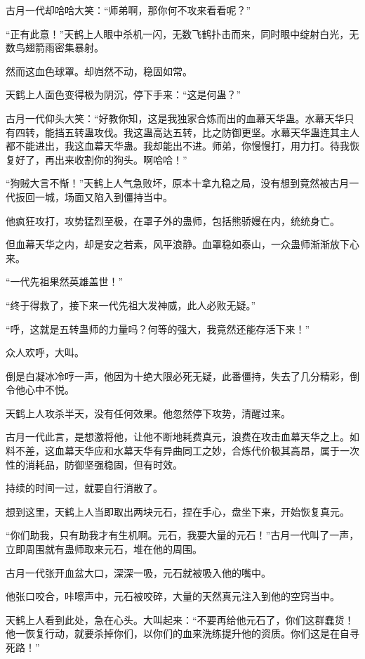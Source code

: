 \begin{this_body}
古月一代却哈哈大笑：“师弟啊，那你何不攻来看看呢？”

“正有此意！”天鹤上人眼中杀机一闪，无数飞鹤扑击而来，同时眼中绽射白光，无数鸟翅箭雨密集暴射。

然而这血色球罩。却岿然不动，稳固如常。

天鹤上人面色变得极为阴沉，停下手来：“这是何蛊？”

古月一代仰头大笑：“好教你知，这是我独家合炼而出的血幕天华蛊。水幕天华只有四转，能挡五转蛊攻伐。我这蛊高达五转，比之防御更坚。水幕天华蛊连其主人都不能进出，我这血幕天华蛊。我却能出不进。师弟，你慢慢打，用力打。待我恢复好了，再出来收割你的狗头。啊哈哈！”

“狗贼大言不惭！”天鹤上人气急败坏，原本十拿九稳之局，没有想到竟然被古月一代扳回一城，场面又陷入到僵持当中。

他疯狂攻打，攻势猛烈至极，在罩子外的蛊师，包括熊骄嫚在内，统统身亡。

但血幕天华之内，却是安之若素，风平浪静。血罩稳如泰山，一众蛊师渐渐放下心来。

“一代先祖果然英雄盖世！”

“终于得救了，接下来一代先祖大发神威，此人必败无疑。”

“呼，这就是五转蛊师的力量吗？何等的强大，我竟然还能存活下来！”

众人欢呼，大叫。

倒是白凝冰冷哼一声，他因为十绝大限必死无疑，此番僵持，失去了几分精彩，倒令他心中不悦。

天鹤上人攻杀半天，没有任何效果。他忽然停下攻势，清醒过来。

古月一代此言，是想激将他，让他不断地耗费真元，浪费在攻击血幕天华之上。如料不差，这血幕天华应和水幕天华有异曲同工之妙，合炼代价极其高昂，属于一次性的消耗品，防御坚强稳固，但有时效。

持续的时间一过，就要自行消散了。

想到这里，天鹤上人当即取出两块元石，捏在手心，盘坐下来，开始恢复真元。

“你们助我，只有助我才有生机啊。元石，我要大量的元石！”古月一代叫了一声，立即周围就有蛊师取来元石，堆在他的周围。

古月一代张开血盆大口，深深一吸，元石就被吸入他的嘴中。

他张口咬合，咔嚓声中，元石被咬碎，大量的天然真元注入到他的空窍当中。

天鹤上人看到此处，急在心头。大叫起来：“不要再给他元石了，你们这群蠢货！他一恢复行动，就要杀掉你们，以你们的血来洗练提升他的资质。你们这是在自寻死路！”


\end{this_body}

